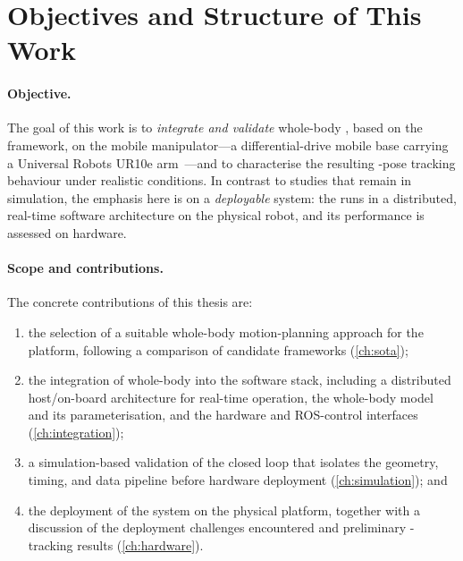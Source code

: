 \section{Objectives and Structure of This Work}
\label{sec:objectives}

\paragraph{Objective.}
The goal of this work is to \emph{integrate and validate} whole-body
\mpc{}, based on the \ocs{} framework, on the \hero{} mobile
manipulator---a differential-drive mobile base carrying a Universal
Robots UR10e arm~\cite{UR10e}---and to characterise the resulting
\ee{}-pose tracking behaviour under realistic conditions. In contrast to
studies that remain in simulation, the emphasis here is on a
\emph{deployable} system: the \mpc{} runs in a distributed,
real-time software architecture on the physical robot, and its
performance is assessed on hardware.

\paragraph{Scope and contributions.}
The concrete contributions of this thesis are:
\begin{enumerate}
  \item the selection of a suitable whole-body motion-planning approach
        for the \hero{} platform, following a comparison of candidate
        frameworks (\cref{ch:sota});
  \item the integration of \ocs{} whole-body \mpc{} into the \hero{}
        software stack, including a distributed host/on-board
        architecture for real-time operation, the whole-body model and
        its parameterisation, and the hardware and \mbox{ROS-control}
        interfaces (\cref{ch:integration});
  \item a simulation-based validation of the closed loop that isolates
        the geometry, timing, and data pipeline before hardware
        deployment (\cref{ch:simulation}); and
  \item the deployment of the system on the physical \hero{} platform,
        together with a discussion of the deployment challenges
        encountered and preliminary \ee{}-tracking results
        (\cref{ch:hardware}).
\end{enumerate}

